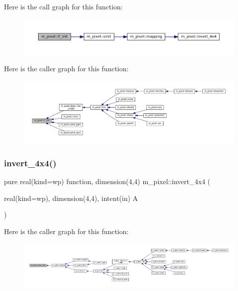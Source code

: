 Here is the call graph for this function\+:
\nopagebreak
\begin{figure}[H]
\begin{center}
\leavevmode
\includegraphics[width=350pt]{namespacem__pixel_a6c23c2779e54da4ac7505cfb816cc2b1_cgraph}
\end{center}
\end{figure}
Here is the caller graph for this function\+:
\nopagebreak
\begin{figure}[H]
\begin{center}
\leavevmode
\includegraphics[width=350pt]{namespacem__pixel_a6c23c2779e54da4ac7505cfb816cc2b1_icgraph}
\end{center}
\end{figure}
\mbox{\label{namespacem__pixel_a630b892544962a88d91b1ab983dc5649}} 
\subsubsection{\texorpdfstring{invert\+\_\+4x4()}{invert\_4x4()}}
{\footnotesize\ttfamily pure real(kind=wp) function, dimension(4,4) m\+\_\+pixel\+::invert\+\_\+4x4 (\begin{DoxyParamCaption}\item[{real(kind=wp), dimension(4,4), intent(in)}]{A }\end{DoxyParamCaption})\hspace{0.3cm}{\ttfamily [private]}}

Here is the caller graph for this function\+:
\nopagebreak
\begin{figure}[H]
\begin{center}
\leavevmode
\includegraphics[width=350pt]{namespacem__pixel_a630b892544962a88d91b1ab983dc5649_icgraph}
\end{center}
\end{figure}
\mbox{\label{namespacem__pixel_ac39c9efa849915aff58657e2df03fe3c}} 
